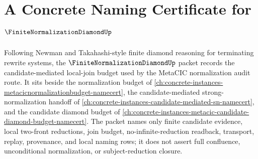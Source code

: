 \chapter{A Concrete Naming Certificate for $\FiniteNormalizationDiamondUp$}
\label{ch:concrete-instances-finite-normalization-diamond-namecert}

Following Newman and Takahashi-style finite diamond reasoning for terminating rewrite systems, the $\FiniteNormalizationDiamondUp$ packet records the candidate-mediated local-join budget used by the MetaCIC normalization audit route. It sits beside the normalization budget of \autoref{ch:concrete-instances-metacicnormalizationbudget-namecert}, the candidate-mediated strong-normalization handoff of \autoref{ch:concrete-instances-candidate-mediated-sn-namecert}, and the candidate diamond budget of \autoref{ch:concrete-instances-metacic-candidate-diamond-budget-namecert}. The packet names only finite candidate evidence, local two-front reductions, join budget, no-infinite-reduction readback, transport, replay, provenance, and local naming rows; it does not assert full confluence, unconditional normalization, or subject-reduction closure.

